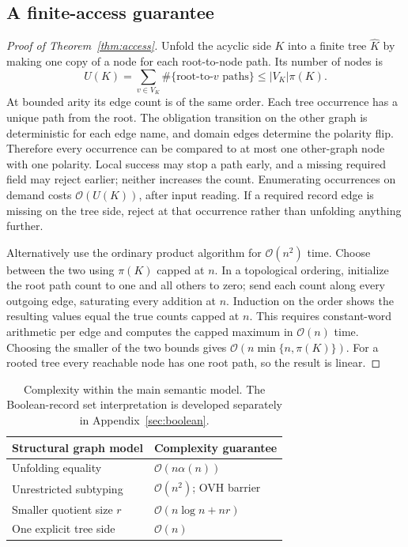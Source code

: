 \documentclass[11pt,letterpaper]{article}
\theoremstyle{definition}\newtheorem{definition}[theorem]{Definition}
\newcommand{\size}[1]{\lvert#1\rvert}
\newcommand{\Oh}{\mathcal O}
\begin{document}
\subsection{A finite-access guarantee}
\begin{proof}[Proof of Theorem~\ref{thm:access}]
Unfold the acyclic side $K$ into a finite tree $\widehat K$ by making one copy of a node for each root-to-node path. Its number of nodes is
\[
 U(K)=\sum_{v\in V_K}\#\{\text{root-to-}v\text{ paths}\}
 \le\size{V_K}\pi(K).
\]
At bounded arity its edge count is of the same order. Each tree occurrence has a unique path from the root. The obligation transition on the other graph is deterministic for each edge name, and domain edges determine the polarity flip. Therefore every occurrence can be compared to at most one other-graph node with one polarity. Local success may stop a path early, and a missing required field may reject earlier; neither increases the count. Enumerating occurrences on demand costs $\Oh(U(K))$, after input reading. If a required record edge is missing on the tree side, reject at that occurrence rather than unfolding anything further.

Alternatively use the ordinary product algorithm for $\Oh(n^2)$ time. Choose between the two using $\pi(K)$ capped at $n$. In a topological ordering, initialize the root path count to one and all others to zero; send each count along every outgoing edge, saturating every addition at $n$. Induction on the order shows the resulting values equal the true counts capped at $n$. This requires constant-word arithmetic per edge and computes the capped maximum in $\Oh(n)$ time. Choosing the smaller of the two bounds gives $\Oh(n\min\{n,\pi(K)\})$. For a rooted tree every reachable node has one root path, so the result is linear.
\end{proof}




\begin{table}[H]
\centering
\begin{tabular}{ll}
\toprule
Structural graph model & Complexity guarantee\\\midrule
Unfolding equality & $\Oh(n\alpha(n))$\\
Unrestricted subtyping & $\Oh(n^2)$; OVH barrier\\
Smaller quotient size $r$ & $\Oh(n\log n+nr)$\\
One explicit tree side & $\Oh(n)$\\\bottomrule
\end{tabular}
\caption{Complexity within the main semantic model. The Boolean-record set interpretation is developed separately in Appendix~\ref{sec:boolean}.}
\label{tab:complexity}
\end{table}
\end{document}
